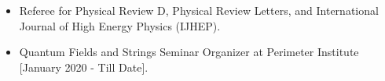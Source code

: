 \begin{itemize}
  \item Referee for Physical Review D, Physical Review Letters, and International Journal of High Energy Physics (IJHEP).
  \item Quantum Fields and Strings Seminar Organizer at Perimeter Institute [January 2020 -  Till Date]. 
  \end{itemize}
